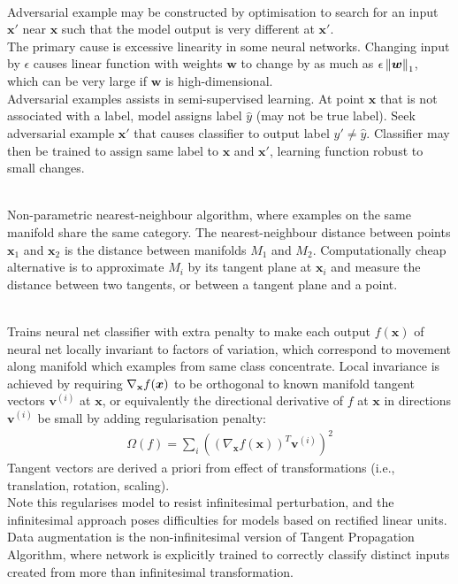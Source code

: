 \begin{remark} \\
Adversarial example may be constructed by optimisation to search for an input $\bm{x}'$ near $\bm{x}$ such that the model output is very different at $\bm{x}'$.\\
The primary cause is excessive linearity in some neural networks. Changing input by $\epsilon$ causes linear function with weights $\bm{w}$ to change by as much as $\epsilon \left\lVert\bm{w}\right\rVert_1$, which can be very large if $\bm{w}$ is high-dimensional.\\
Adversarial examples assists in semi-supervised learning. At point $\bm{x}$ that is not associated with a label, model assigns label $\hat{y}$ (may not be true label). Seek adversarial example $\bm{x}'$ that causes classifier to output label $y' \neq \hat{y}$. Classifier may then be trained to assign same label to $\bm{x}$ and $\bm{x}'$, learning function robust to small changes.
\end{remark}

\begin{remark} \\
Non-parametric nearest-neighbour algorithm, where examples on the same manifold share the same category. The nearest-neighbour distance between points $\bm{x}_1$ and $\bm{x}_2$ is the distance between manifolds $M_1$ and $M_2$. Computationally cheap alternative is to approximate $M_i$ by its tangent plane at $\bm{x}_i$ and measure the distance between two tangents, or between a tangent plane and a point.
\end{remark}

\begin{remark} \\
Trains neural net classifier with extra penalty to make each output $f(\bm{x})$ of neural net locally invariant to factors of variation, which correspond to movement along manifold which examples from same class concentrate. Local invariance is achieved by requiring $\nabla_{\bm{\mathbf{x}}}f(\bm{x})$ to be orthogonal to known manifold tangent vectors $\bm{v}^{(i)}$ at $\bm{x}$, or equivalently the directional derivative of $f$ at $\bm{x}$ in directions $\bm{v}^{(i)}$ be small by adding regularisation penalty:
\begin{align}
\Omega(f) = \sum\limits_i \left( \left( \nabla_{\bm{x}} f(\bm{x}) \right)^T \bm{v}^{(i)} \right)^2 \nonumber
\end{align}
Tangent vectors are derived a priori from effect of transformations (i.e., translation, rotation, scaling).\\
Note this regularises model to resist infinitesimal perturbation, and the infinitesimal approach poses difficulties for models based on rectified linear units.\\
Data augmentation is the non-infinitesimal version of Tangent Propagation Algorithm, where network is explicitly trained to correctly classify distinct inputs created from more than infinitesimal transformation.
\end{remark}

